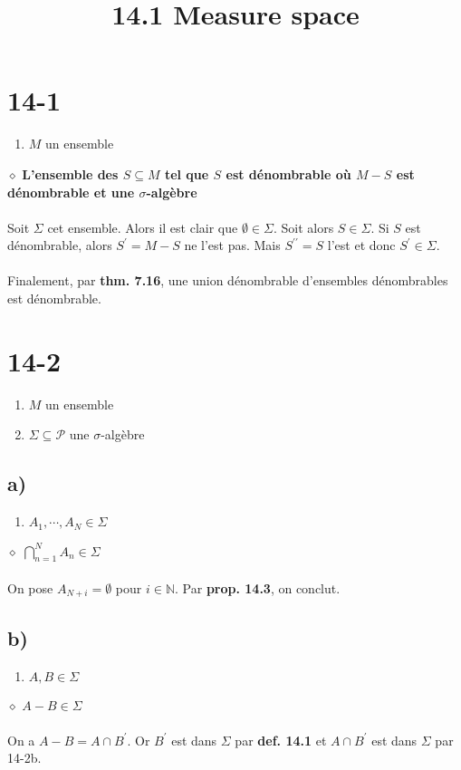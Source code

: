 \documentclass[a4paper,10pt]{article}
\title{14.1 Measure space}
\begin{document}
\maketitle

\section*{14-1}
\begin{enumerate}
	\item $M$ un ensemble
\end{enumerate}
$\diamond$ \textbf{L'ensemble des $S \subseteq M$ tel que $S$ est dénombrable où $M - S$ est dénombrable et une $\sigma$-algèbre}
\\
\\
Soit $\Sigma$ cet ensemble. Alors il est clair que $\emptyset \in \Sigma$. Soit alors $S \in \Sigma$. Si $S$ est dénombrable, alors $S^\prime = M - S$ ne l'est pas. Mais $S^{\prime\prime} = S$ l'est et donc $S^\prime \in \Sigma$.
\\
\\
Finalement, par \textbf{thm. 7.16}, une union dénombrable d'ensembles dénombrables est dénombrable.

\section*{14-2}
\begin{enumerate}
	\item $M$ un ensemble
	\item $\Sigma \subseteq \mathcal{P}$ une $\sigma$-algèbre
\end{enumerate}
\subsection*{a)}
\begin{enumerate}
	\item $A_1, \cdots , A_N \in \Sigma$
\end{enumerate}
$\diamond$ \textbf{$\bigcap_{n=1}^N A_n \in \Sigma$}
\\
\\
On pose $A_{N+i} = \emptyset$ pour $i \in \mathbb{N}$. Par \textbf{prop. 14.3}, on conclut.

\subsection*{b)}
\begin{enumerate}
	\item $A,B \in \Sigma$
\end{enumerate}
$\diamond$ \textbf{$A - B \in \Sigma$}
\\
\\
On a $A - B = A \cap B^\prime$. Or $B^\prime$ est dans $\Sigma$ par \textbf{def. 14.1} et $A\cap B^\prime$ est dans $\Sigma$ par 14-2b.
\end{document}
